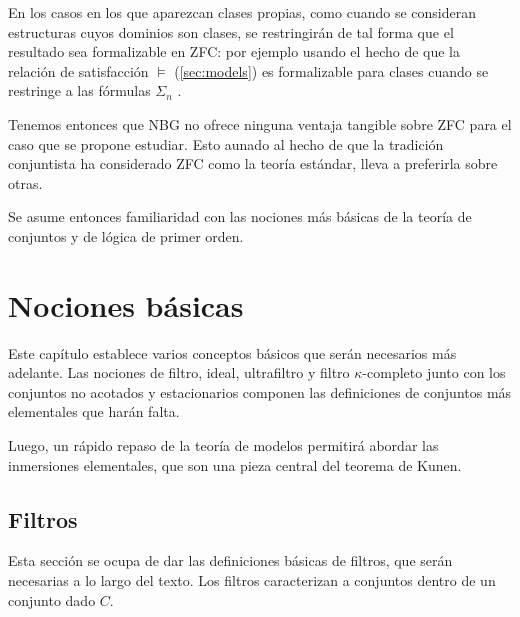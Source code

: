 En los casos en los que aparezcan clases propias, como cuando se consideran estructuras
cuyos dominios son clases, se restringirán de tal forma que el resultado sea formalizable
en ZFC: por ejemplo usando el hecho de que la relación de satisfacción $\models$ (\cref{sec:models})
es formalizable para clases cuando se restringe a las fórmulas $\Sigma_n$
\autocite[pág. 186]{jech_set_2003}.

Tenemos entonces que NBG no ofrece ninguna ventaja tangible sobre ZFC
para el caso que se propone estudiar.
Esto aunado al hecho de que la tradición conjuntista ha considerado ZFC
como la teoría estándar, lleva a preferirla sobre otras.

Se asume entonces familiaridad con las nociones más básicas de la teoría de conjuntos
y de lógica de primer orden.
\fi
\mainmatter
\ifbasicos
\chapter{Nociones básicas}

Este capítulo establece varios conceptos básicos que serán necesarios
más adelante. Las nociones de filtro, ideal, ultrafiltro y filtro $\kappa$-completo
junto con los conjuntos no acotados y estacionarios componen las definiciones de
conjuntos más elementales que harán falta.

Luego, un rápido repaso de la teoría de modelos permitirá abordar las inmersiones
elementales, que son una pieza central del teorema de Kunen.

\section{Filtros}

Esta sección se ocupa de dar las definiciones básicas de filtros,
que serán necesarias a lo largo del texto.
Los filtros caracterizan a conjuntos  dentro
de un conjunto dado $C$.


